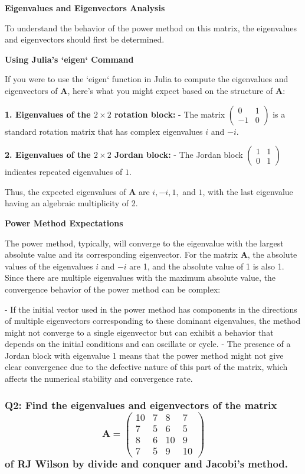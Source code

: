 \documentclass[8pt]{article}
\begin{document}
{\textbf{Eigenvalues and Eigenvectors Analysis}

To understand the behavior of the power method on this matrix, the eigenvalues and eigenvectors should first be determined. 

\textbf{Using Julia's `eigen` Command}

If you were to use the `eigen` function in Julia to compute the eigenvalues and eigenvectors of \(\mathbf{A}\), here's what you might expect based on the structure of \(\mathbf{A}\):

\textbf{1. Eigenvalues of the \(2 \times 2\) rotation block:}
   - The matrix \(\begin{pmatrix} 0 & 1 \\ -1 & 0 \end{pmatrix}\) is a standard rotation matrix that has complex eigenvalues \(i\) and \(-i\).

\textbf{2. Eigenvalues of the \(2 \times 2\) Jordan block:}
   - The Jordan block \(\begin{pmatrix} 1 & 1 \\ 0 & 1 \end{pmatrix}\) indicates repeated eigenvalues of \(1\).

Thus, the expected eigenvalues of \(\mathbf{A}\) are \(i, -i, 1,\) and \(1\), with the last eigenvalue having an algebraic multiplicity of 2.

\textbf{Power Method Expectations}

The power method, typically, will converge to the eigenvalue with the largest absolute value and its corresponding eigenvector. For the matrix \(\mathbf{A}\), the absolute values of the eigenvalues \(i\) and \(-i\) are 1, and the absolute value of 1 is also 1. Since there are multiple eigenvalues with the maximum absolute value, the convergence behavior of the power method can be complex:

- If the initial vector used in the power method has components in the directions of multiple eigenvectors corresponding to these dominant eigenvalues, the method might not converge to a single eigenvector but can exhibit a behavior that depends on the initial conditions and can oscillate or cycle.
- The presence of a Jordan block with eigenvalue 1 means that the power method might not give clear convergence due to the defective nature of this part of the matrix, which affects the numerical stability and convergence rate.

\subsubsection*{Q2: Find the eigenvalues and eigenvectors of the matrix
\[
\mathbf{A} = 
\begin{pmatrix}
10 & 7 & 8 & 7 \\
7 & 5 & 6 & 5 \\
8 & 6 & 10 & 9 \\
7 & 5 & 9 & 10 
\end{pmatrix}
\]
of RJ Wilson by divide and conquer and Jacobi’s method.}

}
\end{document}
